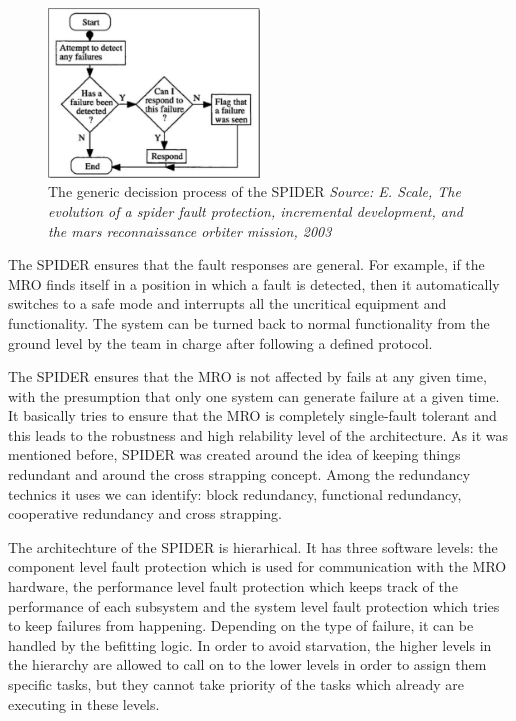 \begin{figure}[htb]
	\begin{center}
	\includegraphics[width=0.5\textwidth]{img/spider.png}
	\caption{The generic decission process of the SPIDER\small{\textit{ Source: E.
	Scale, The evolution of a spider fault protection, incremental development, and
	the mars reconnaissance orbiter mission, 2003}}}
	\label{fig:spider}
	\end{center}
\end{figure}


The SPIDER ensures that the fault responses are general. For example, if the MRO
finds itself in a position in which a fault is detected, then it automatically
switches to a safe mode and interrupts all the uncritical equipment and
functionality. The system can be turned back to normal functionality from the
ground level by the team in charge after following a defined protocol.

The SPIDER ensures that the MRO is not affected by fails at any given time, with
the presumption that only one system can generate failure at a given time. It
basically tries to ensure that the MRO is completely single-fault tolerant and
this leads to the robustness and high relability level of the architecture. As
it was mentioned before, SPIDER was created around the idea of keeping things
redundant and around the cross strapping concept. Among the
redundancy technics it uses we can identify: block redundancy, functional
redundancy, cooperative redundancy and cross strapping.

The architechture of the SPIDER is hierarhical. It has three software
levels: the component level fault protection which is used for communication
with the MRO hardware, the performance level fault protection which keeps track of the
performance of each subsystem and the system level fault protection which tries
to keep failures from happening. Depending on the type of failure, it can be
handled by the befitting logic. In order to avoid starvation, the higher levels
in the hierarchy are allowed to call on to the lower levels in order to assign
them specific tasks, but they cannot take priority of the tasks which
already are executing in these levels.

